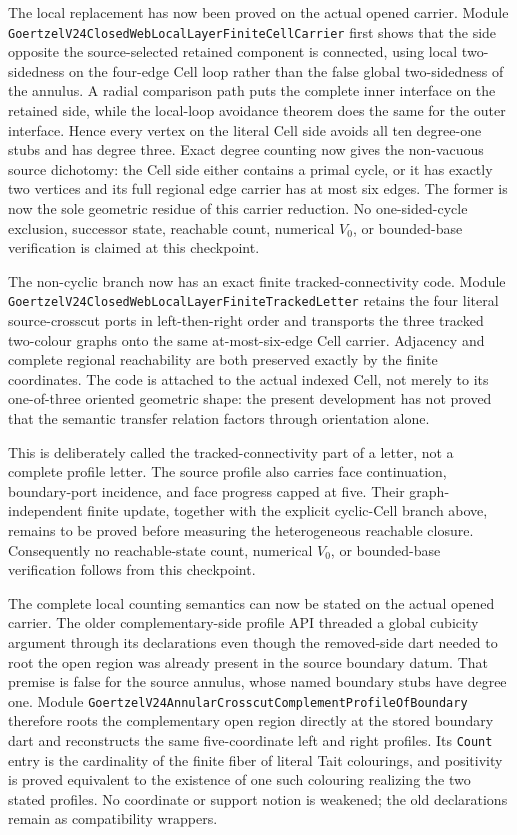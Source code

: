 \documentclass[11pt]{article}
\theoremstyle{definition}
\begin{document}
The local replacement has now been proved on the actual opened carrier.
Module
\texttt{GoertzelV24ClosedWebLocalLayerFiniteCellCarrier} first shows that the
side opposite the source-selected retained component is connected, using
local two-sidedness on the four-edge Cell loop rather than the false global
two-sidedness of the annulus.  A radial comparison path puts the complete
inner interface on the retained side, while the local-loop avoidance theorem
does the same for the outer interface.  Hence every vertex on the literal
Cell side avoids all ten degree-one stubs and has degree three.  Exact degree
counting now gives the non-vacuous source dichotomy: the Cell side either
contains a primal cycle, or it has exactly two vertices and its full regional
edge carrier has at most six edges.  The former is now the sole geometric
residue of this carrier reduction.  No one-sided-cycle exclusion, successor
state, reachable count, numerical $V_0$, or bounded-base verification is
claimed at this checkpoint.

The non-cyclic branch now has an exact finite tracked-connectivity code.
Module
\texttt{GoertzelV24ClosedWebLocalLayerFiniteTrackedLetter} retains the four
literal source-crosscut ports in left-then-right order and transports the
three tracked two-colour graphs onto the same at-most-six-edge Cell carrier.
Adjacency and complete regional reachability are both preserved exactly by
the finite coordinates.  The code is attached to the actual indexed Cell,
not merely to its one-of-three oriented geometric shape: the present
development has not proved that the semantic transfer relation factors
through orientation alone.

This is deliberately called the tracked-connectivity part of a letter, not a
complete profile letter.  The source profile also carries face continuation,
boundary-port incidence, and face progress capped at five.  Their
graph-independent finite update, together with the explicit cyclic-Cell
branch above, remains to be proved before measuring the heterogeneous
reachable closure.  Consequently no reachable-state count, numerical
$V_0$, or bounded-base verification follows from this checkpoint.

The complete local counting semantics can now be stated on the actual opened
carrier.  The older complementary-side profile API threaded a global cubicity
argument through its declarations even though the removed-side dart needed to
root the open region was already present in the source boundary datum.  That
premise is false for the source annulus, whose named boundary stubs have degree
one.  Module
\texttt{GoertzelV24AnnularCrosscutComplementProfileOfBoundary} therefore roots
the complementary open region directly at the stored boundary dart and
reconstructs the same five-coordinate left and right profiles.  Its
\texttt{Count} entry is the cardinality of the finite fiber of literal Tait
colourings, and positivity is proved equivalent to the existence of one such
colouring realizing the two stated profiles.  No coordinate or support notion
is weakened; the old declarations remain as compatibility wrappers.
\end{document}
